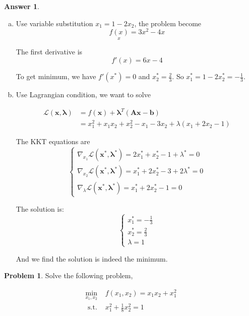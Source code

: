 \documentclass{article}
\theoremstyle{definition}
\newtheorem{prob}{Problem}
\newtheorem{ans}{Answer}
\begin{document}
	\begin{ans}
		~
		
		\begin{enumerate}[(a)]
		\item Use variable substitution $x_1=1-2x_2$, the problem become
		$$
		\underset{x}{f(x)}=3x^2-4x
		$$
		
		The first derivative is 
		$$
		f\prime(x)=6x-4
		$$
		
		To get minimum, we have $f\prime (x^*)=0$ and $x_2^*=\frac{2}{3}$. So $x_1^*=1-2x_2^*=-\frac{1}{3}$.
				
		\item Use Lagrangian condition, we want to solve
		
		$$
		\begin{aligned}
			\mathcal{L}(\boldsymbol{x}, \boldsymbol{\lambda})&=f(\boldsymbol{x})+\boldsymbol{\lambda}^T(\boldsymbol{A} \boldsymbol{x}-\boldsymbol{b})\\
			&=x_{1}^{2}+x_{1} x_{2}+x_{2}^{2}-x_{1}-3 x_{2}+\lambda (x_1+2x_2-1)
		\end{aligned}
		$$
		
		The KKT equations are
		$$
		\left\{\begin{array}{l}
			\nabla_{x_1} \mathcal{L}\left(\boldsymbol{x}^*, \boldsymbol{\lambda}^*\right)=2x_1^*+x_2^*-1+\lambda^*=0 \\
			\nabla_{x_2} \mathcal{L}\left(\boldsymbol{x}^*, \boldsymbol{\lambda}^*\right)=x_1^*+2x_2^*-3+2\lambda^*=0 \\
			\nabla_{\lambda} \mathcal{L}\left(\boldsymbol{x}^*, \boldsymbol{\lambda}^*\right)=x_1^*+2x_2^*-1=0
		\end{array}\right.
		$$
		
		The solution is:
		$$
		\left\{\begin{array}{l}
			x_1^*=-\frac{1}{3}\\
			x_2^*=\frac{2}{3}\\
			\lambda=1
		\end{array}\right.
		$$
		
		And we find the solution is indeed the minimum. 
		\end{enumerate}
	\end{ans}
	
	\begin{prob}
	Solve the following problem,
	
	$$
	\begin{array}{rl}
	\underset{x_1,x_2}{\min} & f\left(x_{1}, x_{2}\right)=x_{1} x_{2}+x_{1}^{2} \\
	\text { s.t. } & x_{1}^{2}+\frac{1}{8} x_{2}^{2}=1
	\end{array}
	$$
	
	\end{prob}
	
\end{document}

